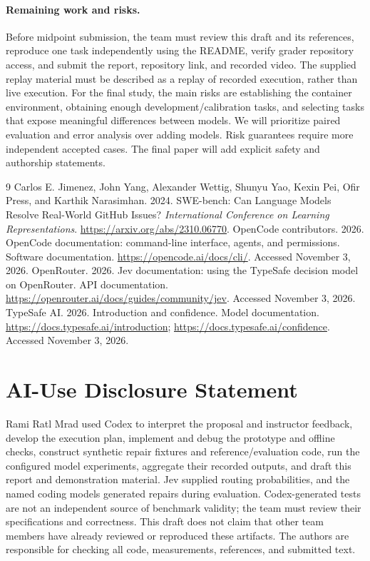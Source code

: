 \documentclass{article}
\begin{document}
\paragraph{Remaining work and risks.}
Before midpoint submission, the team must review this draft and its references, reproduce one task independently using the README, verify grader repository access, and submit the report, repository link, and recorded video. The supplied replay material must be described as a replay of recorded execution, rather than live execution. For the final study, the main risks are establishing the container environment, obtaining enough development/calibration tasks, and selecting tasks that expose meaningful differences between models. We will prioritize paired evaluation and error analysis over adding models. Risk guarantees require more independent accepted cases. The final paper will add explicit safety and authorship statements.

\clearpage
\begin{thebibliography}{9}
Carlos E. Jimenez, John Yang, Alexander Wettig, Shunyu Yao, Kexin Pei, Ofir Press, and Karthik Narasimhan.
2024. SWE-bench: Can Language Models Resolve Real-World GitHub Issues? \emph{International Conference on Learning Representations}. \url{https://arxiv.org/abs/2310.06770}.
OpenCode contributors. 2026. OpenCode documentation: command-line interface, agents, and permissions. Software documentation. \url{https://opencode.ai/docs/cli/}. Accessed November 3, 2026.
OpenRouter. 2026. Jev documentation: using the TypeSafe decision model on OpenRouter. API documentation. \url{https://openrouter.ai/docs/guides/community/jev}. Accessed November 3, 2026.
TypeSafe AI. 2026. Introduction and confidence. Model documentation. \url{https://docs.typesafe.ai/introduction}; \url{https://docs.typesafe.ai/confidence}. Accessed November 3, 2026.
\end{thebibliography}

\section*{AI-Use Disclosure Statement}
Rami Ratl Mrad used Codex to interpret the proposal and instructor feedback, develop the execution plan, implement and debug the prototype and offline checks, construct synthetic repair fixtures and reference/evaluation code, run the configured model experiments, aggregate their recorded outputs, and draft this report and demonstration material. Jev supplied routing probabilities, and the named coding models generated repairs during evaluation. Codex-generated tests are not an independent source of benchmark validity; the team must review their specifications and correctness. This draft does not claim that other team members have already reviewed or reproduced these artifacts. The authors are responsible for checking all code, measurements, references, and submitted text.
\end{document}
